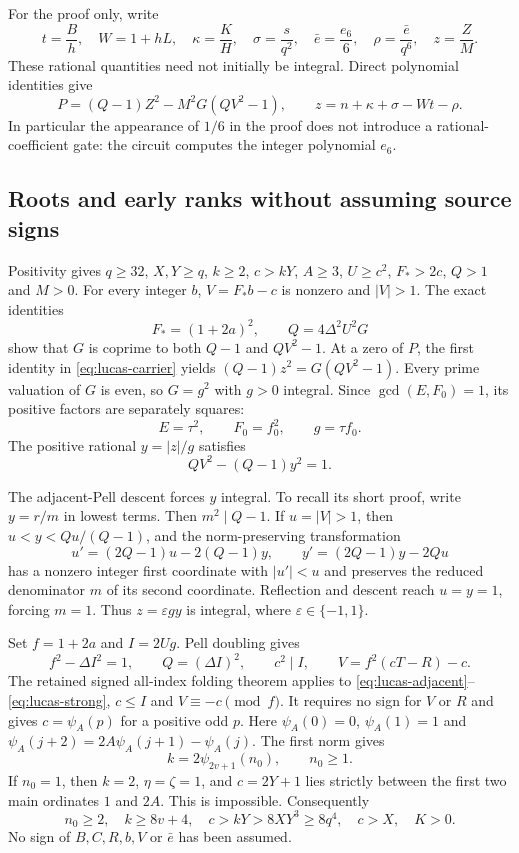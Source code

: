\documentclass[11pt,letterpaper]{article}
\theoremstyle{definition}
\theoremstyle{remark}
\begin{document}
For the proof only, write
\[
 t=\frac Bh,\quad W=1+hL,\quad \kappa=\frac KH,\quad
 \sigma=\frac{s}{q^2},\quad \bar e=\frac{e_6}{6},\quad
 \rho=\frac{\bar e}{q^6},\quad z=\frac ZM.
\]
These rational quantities need not initially be integral.  Direct polynomial
identities give
\begin{equation}
 P=(Q-1)Z^2-M^2G(QV^2-1),\qquad
 z=n+\kappa+\sigma-Wt-\rho.
 \label{eq:lucas-carrier}
\end{equation}
In particular the appearance of $1/6$ in the proof does not introduce a
rational-coefficient gate: the circuit computes the integer polynomial $e_6$.

\subsection{Roots and early ranks without assuming source signs}

Positivity gives $q\ge32$, $X,Y\ge q$, $k\ge2$, $c>kY$, $A\ge3$,
$U\ge c^2$, $F_*>2c$, $Q>1$ and $M>0$.  For every integer $b$,
$V=F_*b-c$ is nonzero and $|V|>1$.  The exact identities
\[
 F_*=(1+2a)^2,\qquad Q=4\Delta^2U^2G
\]
show that $G$ is coprime to both $Q-1$ and $QV^2-1$.  At a zero of $P$,
the first identity in \eqref{eq:lucas-carrier} yields
$(Q-1)z^2=G(QV^2-1)$.  Every prime valuation of $G$ is even, so
$G=g^2$ with $g>0$ integral.  Since $\gcd(E,F_0)=1$, its positive factors
are separately squares:
\[
 E=\tau^2,\qquad F_0=f_0^2,\qquad g=\tau f_0.
\]
The positive rational $y=|z|/g$ satisfies
\begin{equation}
 QV^2-(Q-1)y^2=1.
 \label{eq:lucas-adjacent}
\end{equation}

The adjacent-Pell descent forces $y$ integral.  To recall its short proof,
write $y=r/m$ in lowest terms.  Then $m^2\mid Q-1$.  If $u=|V|>1$, then
$u<y<Qu/(Q-1)$, and the norm-preserving transformation
\[
 u'=(2Q-1)u-2(Q-1)y,\qquad
 y'=(2Q-1)y-2Qu
\]
has a nonzero integer first coordinate with $|u'|<u$ and preserves the
reduced denominator $m$ of its second coordinate.  Reflection and descent
reach $u=y=1$, forcing $m=1$.  Thus $z=\varepsilon gy$ is integral,
where $\varepsilon\in\{-1,1\}$.

Set $f=1+2a$ and $I=2Ug$.  Pell doubling gives
\begin{equation}
 f^2-\Delta I^2=1,\qquad Q=(\Delta I)^2,\qquad c^2\mid I,
 \qquad V=f^2(cT-R)-c.
 \label{eq:lucas-strong}
\end{equation}
The retained signed all-index folding theorem applies to
\eqref{eq:lucas-adjacent}--\eqref{eq:lucas-strong}, $c\le I$ and
$V\equiv-c\pmod f$.  It requires no sign for $V$ or $R$ and gives
$c=\psi_A(p)$ for a positive odd $p$.  Here $\psi_A(0)=0$,
$\psi_A(1)=1$ and $\psi_A(j+2)=2A\psi_A(j+1)-\psi_A(j)$.
The first norm gives
\[
 k=2\psi_{2v+1}(n_0),\qquad n_0\ge1.
\]
If $n_0=1$, then $k=2$, $\eta=\zeta=1$, and $c=2Y+1$ lies strictly
between the first two main ordinates $1$ and $2A$.  This is impossible.
Consequently
\begin{equation}
 n_0\ge2,\quad k\ge8v+4,\quad
 c>kY>8XY^3\ge8q^4,\quad c>X,\quad K>0.
 \label{eq:lucas-early-growth}
\end{equation}
No sign of $B,C,R,b,V$ or $\bar e$ has been assumed.
\end{document}
